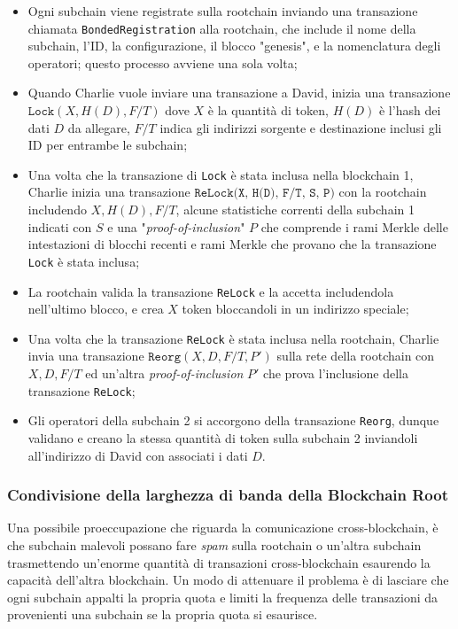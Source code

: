 \documentclass[a4paper,12pt]{article}
\begin{document}
\begin{itemize}
	\item Ogni subchain viene registrate sulla rootchain inviando una transazione chiamata \texttt{BondedRegistration} alla rootchain, che include il nome della subchain, l'ID, la configurazione, il blocco "genesis", e la nomenclatura degli operatori; questo processo avviene una sola volta;

	\item Quando Charlie vuole inviare una transazione a David, inizia una transazione $\texttt{Lock}(X, H(D), F/T)$ dove $X$ è la quantità di token, $H(D)$ è l'hash dei dati $D$ da allegare, $F/T$ indica gli indirizzi sorgente e destinazione inclusi gli ID per entrambe le subchain;

	\item Una volta che la transazione di \texttt{Lock} è stata inclusa nella blockchain 1, Charlie inizia una transazione $\texttt{ReLock(X, H(D), F/T, S, P)}$ con la rootchain includendo $X, H(D), F/T$, alcune statistiche correnti della subchain 1 indicati con $S$ e una "\emph{proof-of-inclusion}" $P$ che comprende i rami Merkle delle intestazioni di blocchi recenti e rami Merkle che provano che la transazione \texttt{Lock} è stata inclusa;

	\item La rootchain valida la transazione \texttt{ReLock} e la accetta includendola nell'ultimo blocco, e crea $X$ token bloccandoli in un indirizzo speciale;

	\item Una volta che la transazione \texttt{ReLock} è stata inclusa nella rootchain, Charlie invia una transazione $\texttt{Reorg}(X, D, F/T, P')$ sulla rete della rootchain con $X, D, F/T$ ed un'altra \emph{proof-of-inclusion} $P'$ che prova l'inclusione della transazione \texttt{ReLock};

	\item Gli operatori della subchain 2 si accorgono della transazione \texttt{Reorg}, dunque validano e creano la stessa quantità di token sulla subchain 2 inviandoli all'indirizzo di David con associati i dati $D$.

\end{itemize}

\subsubsection{Condivisione della larghezza di banda della Blockchain Root}
Una possibile proeccupazione che riguarda la comunicazione cross-blockchain, è che subchain malevoli possano fare \emph{spam} sulla rootchain o un'altra subchain trasmettendo un'enorme quantità di transazioni cross-blockchain esaurendo la capacità dell'altra blockchain. Un modo di attenuare il problema è di lasciare che ogni subchain appalti la propria quota e limiti la frequenza delle transazioni da provenienti una subchain se la propria quota si esaurisce.
\end{document}
